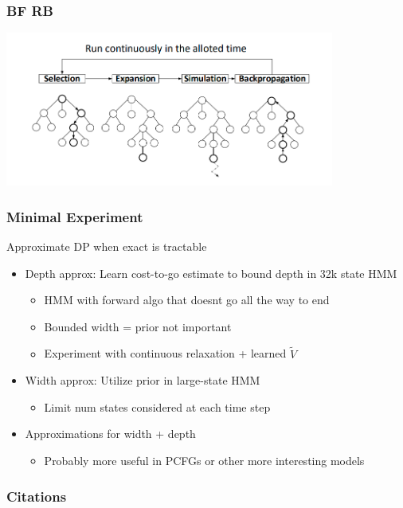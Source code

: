 \documentclass{beamer}
\begin{document}
\begin{frame}
\frametitle{BF RB}
\includegraphics[height=2in]{img/mcts.png}
\end{frame}

\begin{frame}
\frametitle{Minimal Experiment}
Approximate DP when exact is tractable
\begin{itemize}
\item Depth approx: Learn cost-to-go estimate to bound depth in 32k state HMM
    \begin{itemize}
    \item HMM with forward algo that doesnt go all the way to end
    \item Bounded width = prior not important
    \item Experiment with continuous relaxation + learned $\tilde{V}$
    \end{itemize}
\item Width approx: Utilize prior in large-state HMM
    \begin{itemize}
    \item Limit num states considered at each time step
    \end{itemize}
\item Approximations for width + depth
    \begin{itemize}
    \item Probably more useful in PCFGs or other more interesting models
    \end{itemize}
\end{itemize}
\end{frame}

\begin{frame}[allowframebreaks]
\frametitle{Citations}

\end{frame}
\end{document}
